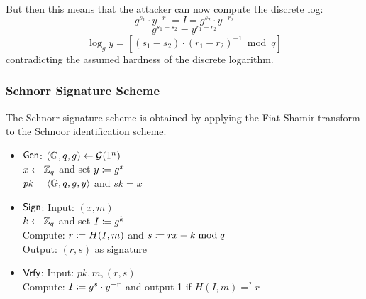 \documentclass[12pt]{article}
\begin{document}
But then this means that the attacker can now compute the discrete log:
\begin{equation*}
g^{s_1} \cdot y^{-r_1} = I = g^{s_2} \cdot y^{-r_2}
\end{equation*}
\begin{equation*}
g^{s_1 - s_2}  = y^{r_1-r_2}
\end{equation*}
\begin{equation*}
\log_gy = [(s_1-s_2)\cdot (r_1-r_2)^{-1} \bmod{q}]
\end{equation*}
contradicting the assumed hardness of the discrete logarithm.


\subsubsection{Schnorr Signature Scheme}
The Schnorr signature scheme is obtained by applying the Fiat-Shamir transform to the Schnoor identification scheme.

\begin{itemize}
	\item $\operatorname{\mathsf{Gen}}$: $(\mathbb{G},q,g)\leftarrow \mathcal{G}(1^n)$\\
	$x \leftarrow \mathbb{Z}_q$ and set $y\coloneqq g^x$\\
	$pk=\langle \mathbb{G},q,g, y\rangle$ and $sk=x$
	\item $\operatorname{\mathsf{Sign}}$: Input: $(x,m)$\\
	$k \leftarrow \mathbb{Z}_q$ and set $I\coloneqq g^k$\\
	Compute: $r \coloneqq H(I,m)$ and $s\coloneqq rx+k \bmod{q}$\\
	Output: $(r,s)$ as signature
	\item $\operatorname{\mathsf{Vrfy}}$: Input: $pk,m, (r,s)$\\
	Compute: $I \coloneqq g^s\cdot y^{-r}$ and output 1 if $H(I,m)=^?r$
\end{itemize}
\end{document}
